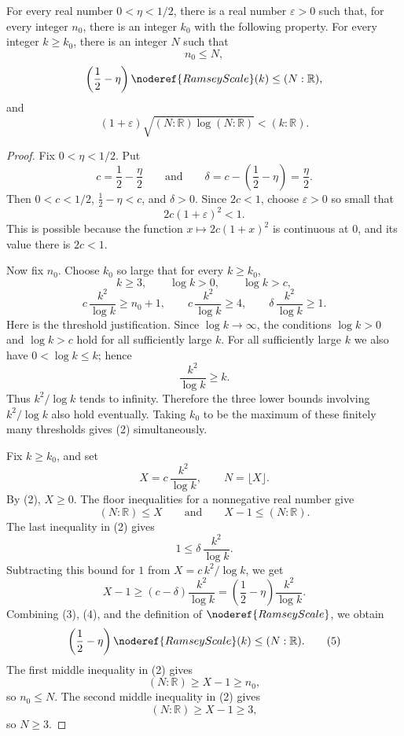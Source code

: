 \begin{helper}
For every real number \(0<\eta<1/2\), there is a real number
\(\varepsilon>0\) such that, for every integer \(n_0\), there is an integer
\(k_0\) with the following property.  For every integer \(k\ge k_0\), there is
an integer \(N\) such that
\[
n_0\le N,
\]
\[
\left(\frac12-\eta\right)\noderef{RamseyScale}(k)\le (N:\mathbb R),
\]
and
\[
(1+\varepsilon)\sqrt{(N:\mathbb R)\log(N:\mathbb R)}<(k:\mathbb R).
\]
\end{helper}
\begin{proof}
Fix \(0<\eta<1/2\).  Put
\[
c=\frac12-\frac{\eta}{2}
\qquad\text{and}\qquad
\delta=c-\left(\frac12-\eta\right)=\frac{\eta}{2}.
\]
Then \(0<c<1/2\), \(\frac12-\eta<c\), and \(\delta>0\).  Since \(2c<1\), choose
\(\varepsilon>0\) so small that
\[
2c(1+\varepsilon)^2<1. \tag{1}
\]
This is possible because the function \(x\mapsto 2c(1+x)^2\) is continuous at
\(0\), and its value there is \(2c<1\).

Now fix \(n_0\).  Choose \(k_0\) so large that for every \(k\ge k_0\),
\[
k\ge3,\qquad \log k>0,\qquad \log k>c,
\]
\[
c\,\frac{k^2}{\log k}\ge n_0+1,\qquad
c\,\frac{k^2}{\log k}\ge4,\qquad
\delta\,\frac{k^2}{\log k}\ge1. \tag{2}
\]
Here is the threshold justification.  Since \(\log k\to\infty\), the
conditions \(\log k>0\) and \(\log k>c\) hold for all sufficiently large
\(k\).  For all sufficiently large \(k\) we also have \(0<\log k\le k\); hence
\[
\frac{k^2}{\log k}\ge k.
\]
Thus \(k^2/\log k\) tends to infinity.  Therefore the three lower bounds
involving \(k^2/\log k\) also hold eventually.  Taking \(k_0\) to be the maximum
of these finitely many thresholds gives (2) simultaneously.

Fix \(k\ge k_0\), and set
\[
X=c\,\frac{k^2}{\log k},\qquad N=\lfloor X\rfloor.
\]
By (2), \(X\ge0\).  The floor inequalities for a nonnegative real number give
\[
(N:\mathbb R)\le X
\qquad\text{and}\qquad
X-1\le (N:\mathbb R). \tag{3}
\]
The last inequality in (2) gives
\[
1\le \delta\,\frac{k^2}{\log k}.
\]
Subtracting this bound for \(1\) from \(X=c\,k^2/\log k\), we get
\[
X-1\ge
\left(c-\delta\right)\frac{k^2}{\log k}
=\left(\frac12-\eta\right)\frac{k^2}{\log k}. \tag{4}
\]
Combining (3), (4), and the definition of \(\noderef{RamseyScale}\), we obtain
\[
\left(\frac12-\eta\right)\noderef{RamseyScale}(k)\le (N:\mathbb R). \tag{5}
\]
The first middle inequality in (2) gives
\[
(N:\mathbb R)\ge X-1\ge n_0,
\]
so \(n_0\le N\).  The second middle inequality in (2) gives
\[
(N:\mathbb R)\ge X-1\ge3,
\]
so \(N\ge3\).


\end{proof}
